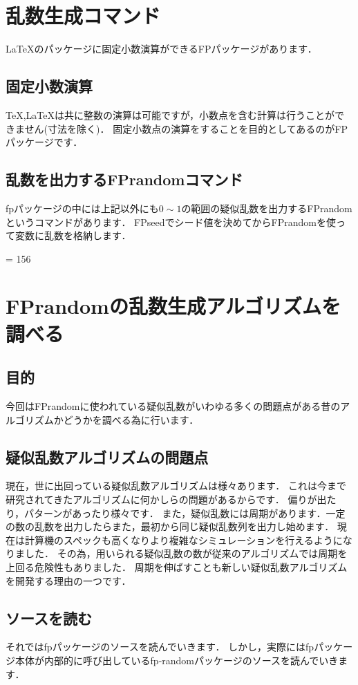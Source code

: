 \section{乱数生成コマンド}
\LaTeX のパッケージに固定小数演算ができるFPパッケージがあります．
\subsection{固定小数演算}
\TeX ,\LaTeX は共に整数の演算は可能ですが，小数点を含む計算は行うことができません(寸法を除く)．
固定小数点の演算をすることを目的としてあるのがFPパッケージです．
\subsection{乱数を出力するFPrandomコマンド}
fpパッケージの中には上記以外にも$0\sim 1$の範囲の疑似乱数を出力するFPrandomというコマンドがあります．
FPseedでシード値を決めてからFPrandomを使って変数に乱数を格納します．
\begin{texcode}
\FPseed = 156
\FPrandom{\result}
\FPprint{\result}
\end{texcode}

\section{FPrandomの乱数生成アルゴリズムを調べる}
\subsection{目的}
今回はFPrandomに使われている疑似乱数がいわゆる多くの問題点がある昔のアルゴリズムかどうかを調べる為に行います．

\subsection{疑似乱数アルゴリズムの問題点}
現在，世に出回っている疑似乱数アルゴリズムは様々あります．
これは今まで研究されてきたアルゴリズムに何かしらの問題があるからです．
偏りが出たり，パターンがあったり様々です．
また，疑似乱数には周期があります．一定の数の乱数を出力したらまた，最初から同じ疑似乱数列を出力し始めます．
現在は計算機のスペックも高くなりより複雑なシミュレーションを行えるようになりました．
その為，用いられる疑似乱数の数が従来のアルゴリズムでは周期を上回る危険性もありました．
周期を伸ばすことも新しい疑似乱数アルゴリズムを開発する理由の一つです．

\subsection{ソースを読む}
それではfpパッケージのソースを読んでいきます．
しかし，実際にはfpパッケージ本体が内部的に呼び出しているfp-randomパッケージのソースを読んでいきます．

